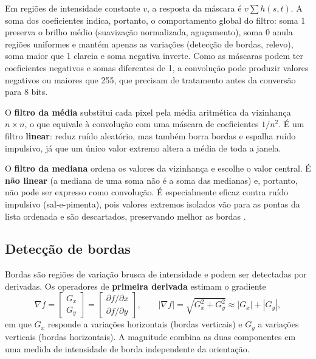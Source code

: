 \documentclass[11pt,a4paper]{article}
\begin{document}
Em regiões de intensidade constante $v$, a resposta da máscara é $v \sum h(s,t)$. A soma dos
coeficientes indica, portanto, o comportamento global do filtro: soma 1 preserva o brilho
médio (suavização normalizada, aguçamento), soma 0 anula regiões uniformes e mantém apenas as
variações (detecção de bordas, relevo), soma maior que 1 clareia e soma negativa inverte.
Como as máscaras podem ter coeficientes negativos e somas diferentes de 1, a convolução pode
produzir valores negativos ou maiores que 255, que precisam de tratamento antes da conversão
para 8 bits.

O \textbf{filtro da média} substitui cada pixel pela média aritmética da vizinhança
$n \times n$, o que equivale à convolução com uma máscara de coeficientes $1/n^2$. É um
filtro \textbf{linear}: reduz ruído aleatório, mas também borra bordas e espalha ruído
impulsivo, já que um único valor extremo altera a média de toda a janela.

O \textbf{filtro da mediana} ordena os valores da vizinhança e escolhe o valor central. É
\textbf{não linear} (a mediana de uma soma não é a soma das medianas) e, portanto, não pode
ser expresso como convolução. É especialmente eficaz contra ruído impulsivo
(sal-e-pimenta), pois valores extremos isolados vão para as pontas da lista ordenada e são
descartados, preservando melhor as bordas \cite{gonzalez,pedrini}.

\subsection{Detecção de bordas}

Bordas são regiões de variação brusca de intensidade e podem ser detectadas por derivadas.
Os operadores de \textbf{primeira derivada} estimam o gradiente
\begin{equation}
  \nabla f = \begin{bmatrix} G_x \\ G_y \end{bmatrix}
           = \begin{bmatrix} \partial f / \partial x \\ \partial f / \partial y \end{bmatrix},
  \qquad
  |\nabla f| = \sqrt{G_x^2 + G_y^2} \approx |G_x| + |G_y|,
\end{equation}
em que $G_x$ responde a variações horizontais (bordas verticais) e $G_y$ a variações
verticais (bordas horizontais). A magnitude combina as duas componentes em uma medida de
intensidade de borda independente da orientação.
\end{document}
